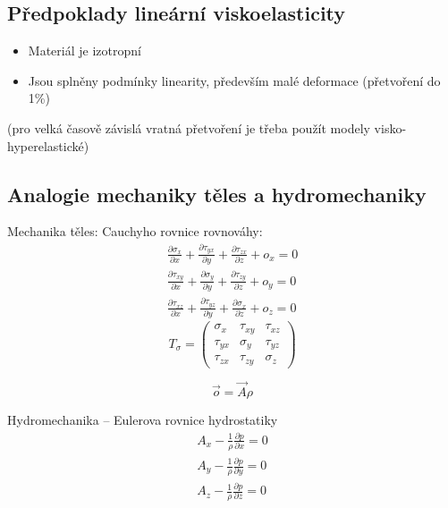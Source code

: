 \subsection{Předpoklady lineární viskoelasticity}
\begin{itemize}
	\item Materiál je izotropní
	\item Jsou splněny podmínky linearity, především malé deformace (přetvoření do 1\%)
\end{itemize}

(pro velká časově závislá vratná přetvoření je třeba použít modely visko-hyperelastické)

\subsection{Analogie mechaniky těles a hydromechaniky}
Mechanika těles:
Cauchyho rovnice rovnováhy:
\begin{align}
	\frac{\partial \sigma_x}{\partial x} +
	\frac{\partial \tau_{yx}}{\partial y} +
	\frac{\partial \tau_{zx}}{\partial z} + o_x = 0\\
	\frac{\partial \tau_{xy}}{\partial x} +
	\frac{\partial \sigma_y}{\partial y} +
	\frac{\partial \tau_{zy}}{\partial z} + o_y = 0\\
	\frac{\partial \tau_{xz}}{\partial x} +
	\frac{\partial \tau_{yz}}{\partial y} +
	\frac{\partial \sigma_x}{\partial z} + o_z = 0
\end{align}
\begin{equation}
	T_\sigma = \left( \begin{matrix}
		\sigma_x & \tau_{xy} & \tau_{xz}\\
		\tau_{yx} & \sigma_y & \tau_{yz}\\
		\tau_{zx} & \tau_{zy} & \sigma_z
	\end{matrix} \right)
\end{equation}

\begin{equation}
	\vec{o} = \vec{A} \rho
\end{equation}

Hydromechanika -- Eulerova rovnice hydrostatiky
\begin{align}
	A_x - \frac{1}{\rho} \frac{\partial p}{\partial x} = 0\\
	A_y - \frac{1}{\rho} \frac{\partial p}{\partial y} = 0\\
	A_z - \frac{1}{\rho} \frac{\partial p}{\partial z} = 0
\end{align}

